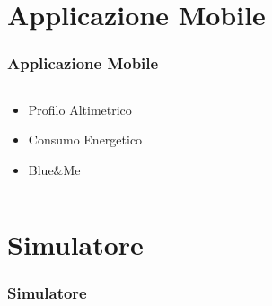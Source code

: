 \documentclass[11pt]{beamer}
\begin{document}
\section{Applicazione Mobile}
\begin{frame}
	\frametitle{Applicazione Mobile}
	\begin{columns}
		\begin{column}{.5\textwidth}
			\begin{itemize}
				\item<1-> Profilo Altimetrico
				\item<2-> Consumo Energetico
				\item<3-> Blue\&{}Me
			\end{itemize}
		\end{column}
		\begin{column}{.5\textwidth}
		\end{column}
	\end{columns}
\end{frame}

\section{Simulatore}
\begin{frame}
	\frametitle{Simulatore}
\end{frame}
\end{document}
